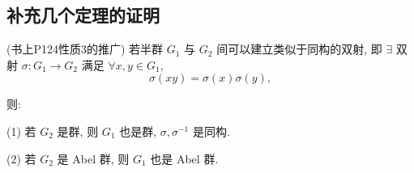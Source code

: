 \documentclass{ctexart}
\begin{document}
\subsection{补充几个定理的证明}
\begin{theorem}(书上P124性质3的推广)
    若半群 $G_1$ 与 $G_2$ 间可以建立类似于同构的双射, 即 $\exists$ 双射 $\sigma:G_1\to G_2$ 满足 $\forall x,y\in G_1$,
    \begin{equation}\label{eq2.1}
        \sigma(xy)=\sigma(x)\sigma(y),
    \end{equation}

    则:

    (1) 若 $G_2$ 是群, 则 $G_1$ 也是群, $\sigma,\sigma^{-1}$ 是同构.

    (2) 若 $G_2$ 是 Abel 群, 则 $G_1$ 也是 Abel 群.
\end{theorem}
\end{document}

